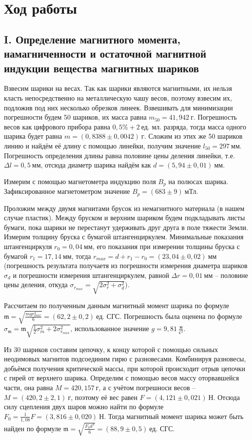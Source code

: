 \documentclass[a4paper,10pt]{article}
\begin{document}
\section*{Ход работы}

\subsection*{I. Определение магнитного момента, намагниченности и остаточной магнитной индукции вещества магнитных шариков}

Взвесим шарики на весах. Так как шарики являются магнитными, их нельзя класть непосредственно на металлическую чашу весов, поэтому взвесим их, подложив под них несколько обрезков линеек. Взвешивать для минимизации погрешности будем 50 шариков, их масса равна $m_{50}=41,942~\text{г}$. Погрешность весов как цифрового прибора равна $0,5\%+2~\text{ед. мл. разряда}$, тогда масса одного шарика будет равна $m=(0,8388\pm0,0042)~\text{г}$. Сложим из этих же 50 шариков линию и найдём её длину с помощью линейки, получим значение $l_{50}=297~\text{мм}$. Погрешность определения длины равна половине цены деления линейки, т.е. $\Delta l=0,5~\text{мм}$, отсюда диаметр шарика найдём как $d=(5,94\pm0,01)~\text{мм}$.

Измерим с помощью магнетометра индукцию поля $B_p$ на полюсах шарика. Зафиксированное магнетометром значение $B_p=(683\pm9)~\text{мТл}$.

Проложим между двумя магнитами брусок из немагнитного материала (в нашем случае пластик). Между бруском и верхним шариком будем подкладывать листы бумаги, пока шарики не перестанут удерживать друг друга в поле тяжести Земли. Измерим толщину бруска с бумагой штангенциркулем. Минимальные показания штангенциркуля $r_0=0,04~\text{мм}$, его показания при измерении толщины бруска с бумагой $r_1=17,14~\text{мм}$, тогда $r_{max}=d+r_1-r_0=(23,04\pm0,02)~\text{мм}$ (погрешность результата получаетя из погрешности измерения диаметра шариков $\sigma_d$ и погрешности измерения штангенциркулем, равной $\Delta r=0,01~\text{мм}$ -- половине цены деления, откуда $\sigma_{r_{max}}=\sqrt{2\sigma_r^2+\sigma_d^2}$).

Рассчитаем по полученным данным магнитный момент шарика по формуле $\mathfrak{m}=\sqrt{\frac{mgr^4_{max}}{6}}=(62,2\pm0,2)~\text{ед. СГС}$. Погрешность была оценена по формуле $\sigma_{\mathfrak{m}}=\mathfrak{m}\sqrt{\frac{1}{2}\sigma_m^2+2\sigma_{r_{max}}^2}$, использованное значение $g=9,81~\frac{\text{м}}{\text{с}^2}$.

Из 30 шариков составим цепочку, к концу которой с помощью сильных неодимовых магнитов подсоединим гирю с разновесами. Комбинируя разновесы, добьёмся получения критической массы, при которой происходит отрыв цепочки с гирей от верхнего шарика. Определим с помощью весов массу оторвавшейся части, она равна $M=420,157~\text{г}$, а с учётом погрешноси весов -- $M=(420,2\pm2,1)~\text{г}$, поэтому её вес равен $F=(4,121\pm0,021)~\text{Н}$. Отсюда силу сцепления двух шаров можно найти по формуле $F_0=\frac{1}{1,08}F=(3,816\pm0,020)~\text{Н}$. Тогда магнитный момент шарика может быть найден по формуле $\mathfrak{m}=\sqrt{\frac{F_0d^4}{6}}=(88,9\pm0,5)~\text{ед. СГС}$.
\end{document}
